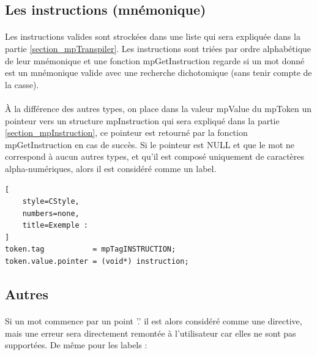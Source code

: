 \documentclass[12pt]{report} %
\begin{document}
    \subsection{Les instructions (mnémonique)}

    \paragraph{}
    Les instructions valides sont strockées dans une liste qui sera expliquée dans la partie \ref {section_mpTranspiler}. Les instructions sont triées par ordre alphabétique de leur mnémonique et une fonction {\ttfamily mpGetInstruction} regarde si un mot donné est un mnémonique valide avec une recherche dichotomique (sans tenir compte de la casse).

    \paragraph{}
    À la différence des autres types, on place dans la valeur {\ttfamily mpValue} du {\ttfamily mpToken} un pointeur vers un structure {\ttfamily mpInstruction} qui sera expliqué dans la partie \ref{section_mpInstruction}, ce pointeur est retourné par la fonction {\ttfamily mpGetInstruction} en cas de succès. Si le pointeur est {\ttfamily NULL} et que le mot ne correspond à aucun autres types, et qu'il est composé uniquement de caractères alpha-numériques, alors il est considéré comme un label.

\begin{lstlisting}[
    style=CStyle,
    numbers=none,
    title=Exemple :
]
token.tag           = mpTagINSTRUCTION;
token.value.pointer = (void*) instruction;
\end{lstlisting}

    \subsection{Autres}
    \paragraph{} Si un mot commence par un point '{\ttfamily .}' il est alors considéré comme une directive, mais une erreur sera directement remontée à l'utilisateur car elles ne sont pas supportées. De même pour les labels :
\end{document}
